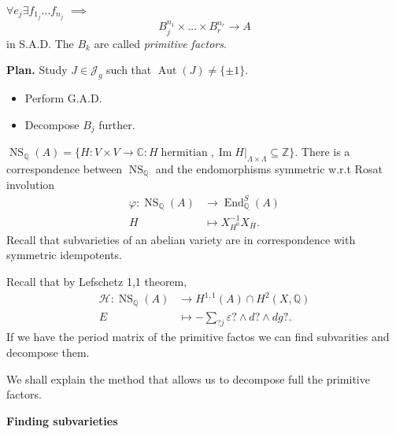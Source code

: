 $\forall e_j \exists f_{1_j}… f_{n_j}$
$\implies$
$$
B_j^{n_1}\times … \times B_r^{n_r}
\to A
$$
in S.A.D. The $B_k$ are called {\it
primitive factors}.

\medskip\noindent
{\bf Plan.} Study
$J \in \mathcal{J}_g$ such that
$\operatorname{Aut}(J) \neq  \{\pm 1\}$.
\begin{itemize}
\item Perform G.A.D.
\item Decompose $B_j$ further.
\end{itemize}

$\operatorname{NS}_{\mathbb{Q}}(A)
=
\{H: V \times V \to \mathbb{C}:
H \operatorname{hermitian},
\operatorname{Im}H|_{\Lambda \times \Lambda}
\subseteq \mathbb{Z}\}$.
There is a correspondence between
$\operatorname{NS}_{\mathbb{Q}}$
and the endomorphisms symmetric w.r.t
Rosat involution
$$
\begin{aligned}
\varphi: \operatorname{NS}_{\mathbb{Q}}(A)
&\longrightarrow
\operatorname{End}_\mathbb{Q}^S(A) \\
H &\longmapsto 
X_{H^0}^{-1} X_H.
\end{aligned}
$$
\noindent
Recall that subvarieties of an abelian
variety are in correspondence with symmetric
idempotents.

Recall that by Lefschetz 1,1 theorem,
$$
\begin{aligned}
\mathcal{H}:
\operatorname{NS}_{\mathbb{Q}}(A)
&\longrightarrow H^{1,1}(A) \cap
H^2(X,\mathbb{Q}) \\
E &\longmapsto 
- \sum_{?j}\varepsilon?\wedge d? \wedge dg?.
\end{aligned}
$$
\noindent
If we have the period matrix of the
primitive factos we can find subvarities and
decompose them.

\medskip\noindent
We shall explain the method that allows us
to decompose full the primitive factors.

\medskip\noindent
{\bf Finding subvarieties}

